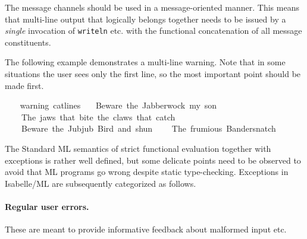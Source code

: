 \begin{isabellebody}
\begin{isamarkuptext}
  \begin{warn}
  The message channels should be used in a message-oriented manner.
  This means that multi-line output that logically belongs together
  needs to be issued by a \emph{single} invocation of \verb|writeln|
  etc.  with the functional concatenation of all message constituents.
  \end{warn}%
\end{isamarkuptext}%
\isamarkuptrue%
%
\endisatagmlref
{\isafoldmlref}%
%
\isadelimmlref
%
\endisadelimmlref
%
\isadelimmlex
%
\endisadelimmlex
%
\isatagmlex
%
\begin{isamarkuptext}%
The following example demonstrates a multi-line
  warning.  Note that in some situations the user sees only the first
  line, so the most important point should be made first.%
\end{isamarkuptext}%
\isamarkuptrue%
%
\endisatagmlex
{\isafoldmlex}%
%
\isadelimmlex
%
\endisadelimmlex
%
\isadelimML
%
\endisadelimML
%
\isatagML
{}\isamarkupfalse%
\ {\isacharverbatimopen}\isanewline
\ \ warning\ {\isacharparenleft}cat{\isacharunderscore}lines\isanewline
\ \ \ {\isacharbrackleft}{\isachardoublequote}Beware\ the\ Jabberwock{\isacharcomma}\ my\ son{\isacharbang}{\isachardoublequote}{\isacharcomma}\isanewline
\ \ \ \ {\isachardoublequote}The\ jaws\ that\ bite{\isacharcomma}\ the\ claws\ that\ catch{\isacharbang}{\isachardoublequote}{\isacharcomma}\isanewline
\ \ \ \ {\isachardoublequote}Beware\ the\ Jubjub\ Bird{\isacharcomma}\ and\ shun{\isachardoublequote}{\isacharcomma}\isanewline
\ \ \ \ {\isachardoublequote}The\ frumious\ Bandersnatch{\isacharbang}{\isachardoublequote}{\isacharbrackright}{\isacharparenright}{\isacharsemicolon}\isanewline
{\isacharverbatimclose}%
\endisatagML
{\isafoldML}%
%
\isadelimML
%
\endisadelimML
%
\isamarkuptrue%
%
\begin{isamarkuptext}%
The Standard ML semantics of strict functional evaluation
  together with exceptions is rather well defined, but some delicate
  points need to be observed to avoid that ML programs go wrong
  despite static type-checking.  Exceptions in Isabelle/ML are
  subsequently categorized as follows.

  \paragraph{Regular user errors.}  These are meant to provide
  informative feedback about malformed input etc.


\end{isamarkuptext}
\end{isabellebody}
